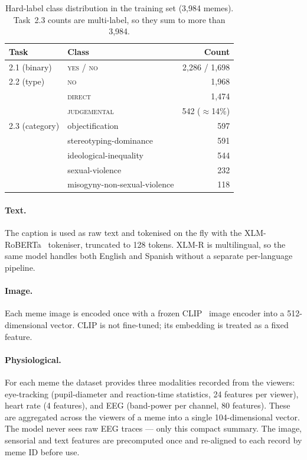 \documentclass[11pt,a4paper]{article}
\begin{document}
\begin{table}[H]
\centering
\small
\caption{Hard-label class distribution in the training set (3{,}984 memes).
Task~2.3 counts are multi-label, so they sum to more than 3{,}984.}
\label{tab:dist}
\begin{tabular}{llr}
\toprule
Task & Class & Count \\
\midrule
2.1 (binary) & \textsc{yes} / \textsc{no} & 2{,}286 / 1{,}698 \\
\midrule
2.2 (type)   & \textsc{no}          & 1{,}968 \\
             & \textsc{direct}      & 1{,}474 \\
             & \textsc{judgemental} & \phantom{0}542 ($\approx$14\%) \\
\midrule
2.3 (category) & objectification              & 597 \\
               & stereotyping-dominance       & 591 \\
               & ideological-inequality       & 544 \\
               & sexual-violence              & 232 \\
               & misogyny-non-sexual-violence & 118 \\
\bottomrule
\end{tabular}
\end{table}

\paragraph{Text.} The caption is used as raw text and tokenised on the fly with the XLM-RoBERTa~\cite{xlmr}
tokeniser, truncated to 128 tokens. XLM-R is multilingual, so the same model handles both English
and Spanish without a separate per-language pipeline.

\paragraph{Image.} Each meme image is encoded once with a frozen CLIP~\cite{clip} image encoder into a
512-dimensional vector. CLIP is not fine-tuned; its embedding is treated as a fixed feature.

\paragraph{Physiological.} For each meme the dataset provides three modalities recorded from the
viewers: eye-tracking (pupil-diameter and reaction-time statistics, 24 features per viewer),
heart rate (4 features), and EEG (band-power per channel, 80 features). These are
aggregated across the viewers of a meme into a single 104-dimensional vector. The model never sees
raw EEG traces --- only this compact summary. The image, sensorial and text features are precomputed
once and re-aligned to each record by meme ID before use.
\end{document}
